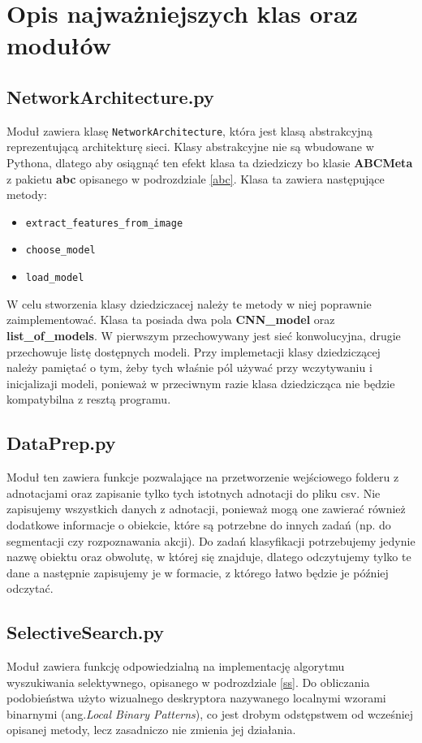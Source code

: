 \documentclass[a4paper,twoside,12pt]{book}
\newcommand{\obcy}[1]{\emph{#1}}
\newcommand{\ang}[1]{{\selectlanguage{british}\obcy{#1}}}
\begin{document}
{\section{Opis najważniejszych klas oraz modułów}
\subsection{NetworkArchitecture.py}
{Moduł zawiera klasę \lstinline|NetworkArchitecture|, która jest klasą abstrakcyjną reprezentującą architekturę sieci. Klasy abstrakcyjne nie są wbudowane w Pythona, dlatego aby osiągnąć ten efekt klasa ta dziedziczy bo klasie \textbf{ABCMeta} z pakietu \textbf{abc} opisanego w podrozdziale \ref{abc}. Klasa ta zawiera następujące metody:}
\begin{itemize}
\item {\lstinline|extract_features_from_image|}
\item{\lstinline|choose_model|}
\item{\lstinline|load_model|}
\end{itemize}
{W celu stworzenia klasy dziedziczacej należy te metody w niej poprawnie zaimplementować. Klasa ta posiada dwa pola \textbf{CNN\_model} oraz \textbf{list\_of\_models}. W pierwszym przechowywany jest sieć konwolucyjna, drugie przechowuje listę dostępnych modeli. Przy implemetacji klasy dziedziczącej należy pamiętać o tym, żeby tych właśnie pól używać przy wczytywaniu i inicjalizaji modeli, ponieważ w przeciwnym razie klasa dziedzicząca nie będzie kompatybilna z resztą programu.}

\subsection{DataPrep.py}
{Moduł ten zawiera funkcje pozwalające na przetworzenie wejściowego folderu z adnotacjami oraz zapisanie tylko tych istotnych adnotacji do pliku csv. Nie zapisujemy wszystkich danych z adnotacji, ponieważ mogą one zawierać również dodatkowe informacje o obiekcie, które są potrzebne do innych zadań (np. do segmentacji czy rozpoznawania akcji). Do zadań klasyfikacji potrzebujemy jedynie nazwę obiektu oraz obwolutę, w której się znajduje, dlatego odczytujemy tylko te dane a następnie zapisujemy je w formacie, z którego łatwo będzie je później odczytać. }
\subsection{SelectiveSearch.py}
{Moduł zawiera funkcję odpowiedzialną na implementację algorytmu wyszukiwania selektywnego, opisanego w podrozdziale \ref{ss}. Do obliczania podobieństwa użyto wizualnego deskryptora nazywanego localnymi wzorami binarnymi (ang.\ang {Local Binary Patterns}), co jest drobym odstępstwem od wcześniej opisanej metody, lecz zasadniczo nie zmienia jej działania. }
}
\end{document}
